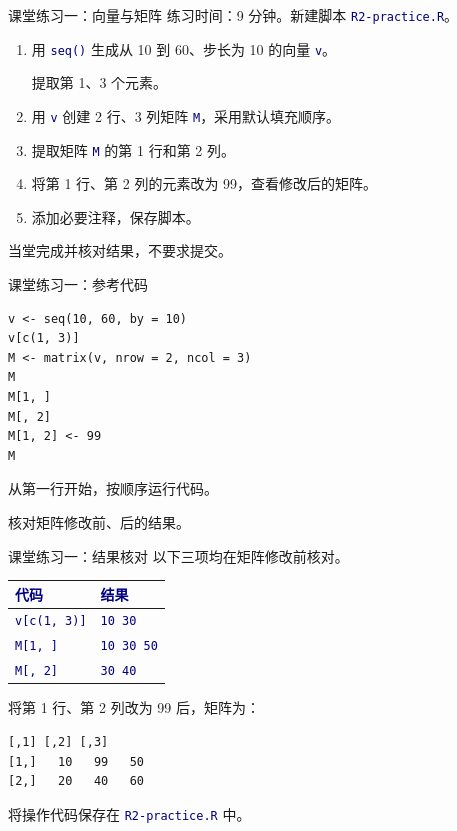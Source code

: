 \documentclass[14pt,compress,t,noamsthm,notheorem,table,handout,fontset=none]{ctexbeamer}
\newcommand{\code}[1]{\textcolor{navy}{\texttt{#1}}}
\newcommand{\thead}[1]{\textcolor{navy}{\textbf{#1}}}
\begin{document}
\begin{frame}{课堂练习一：向量与矩阵}
  \small
  练习时间：9 分钟。新建脚本 \code{R2-practice.R}。
  \begin{enumerate}
    \item 用 \code{seq()} 生成从 10 到 60、步长为 10 的向量 \code{v}。\par
      提取第 1、3 个元素。
    \item 用 \code{v} 创建 2 行、3 列矩阵 \code{M}，采用默认填充顺序。
    \item 提取矩阵 \code{M} 的第 1 行和第 2 列。
    \item 将第 1 行、第 2 列的元素改为 99，查看修改后的矩阵。
    \item 添加必要注释，保存脚本。
  \end{enumerate}
  \vfill
  当堂完成并核对结果，不要求提交。
\end{frame}

\begin{frame}[fragile]{课堂练习一：参考代码}
\begin{lstlisting}
v <- seq(10, 60, by = 10)
v[c(1, 3)]
M <- matrix(v, nrow = 2, ncol = 3)
M
M[1, ]
M[, 2]
M[1, 2] <- 99
M
\end{lstlisting}
  \vfill
  从第一行开始，按顺序运行代码。\par
  核对矩阵修改前、后的结果。
\end{frame}

\begin{frame}[fragile]{课堂练习一：结果核对}
  \small
  以下三项均在矩阵修改前核对。
  \par\vspace{0.4em}
  \renewcommand{\arraystretch}{1.4}
  \begin{tabular*}{\linewidth}{@{\extracolsep{\fill}}ll@{}}
    \toprule
    \thead{代码} & \thead{结果} \\
    \midrule
    \code{v[c(1, 3)]} & \code{10 30} \\
    \code{M[1, ]} & \code{10 30 50} \\
    \code{M[, 2]} & \code{30 40} \\
    \bottomrule
  \end{tabular*}\par
  \vspace{0.5em}
  将第 1 行、第 2 列改为 99 后，矩阵为：
\begin{lstlisting}[style=output]
     [,1] [,2] [,3]
[1,]   10   99   50
[2,]   20   40   60
\end{lstlisting}
  将操作代码保存在 \code{R2-practice.R} 中。
\end{frame}
\end{document}
